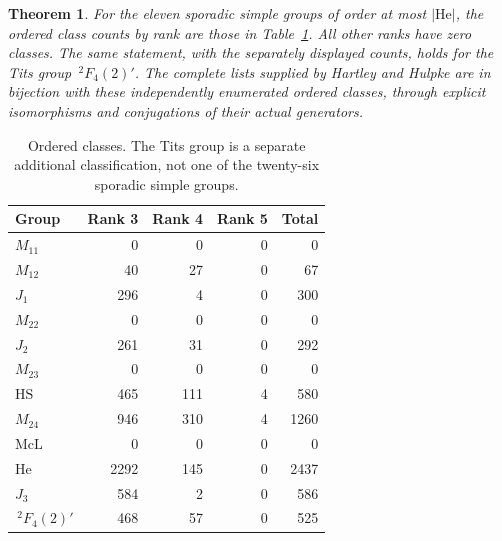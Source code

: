 \documentclass[11pt,a4paper]{article}
\newtheorem{theorem}{Theorem}
\begin{document}
\begin{theorem}\label{sporadic}
For the eleven sporadic simple groups of order at most $|\mathrm{He}|$,
the ordered class counts by rank are those in Table~\ref{sporadic-table}.
All other ranks have zero classes. The same statement, with the separately
displayed counts, holds for the Tits group $\,{}^2F_4(2)'$.
The complete lists supplied by Hartley and Hulpke are in bijection with
these independently enumerated ordered classes, through explicit
isomorphisms and conjugations of their actual generators.
\end{theorem}
\begin{table}[ht]
\centering
\begin{tabular}{lrrrr}
\toprule Group & Rank 3 & Rank 4 & Rank 5 & Total\\\midrule
$M_{11}$ & 0 & 0 & 0 & 0\\
$M_{12}$ & 40 & 27 & 0 & 67\\
$J_1$ & 296 & 4 & 0 & 300\\
$M_{22}$ & 0 & 0 & 0 & 0\\
$J_2$ & 261 & 31 & 0 & 292\\
$M_{23}$ & 0 & 0 & 0 & 0\\
$\mathrm{HS}$ & 465 & 111 & 4 & 580\\
$M_{24}$ & 946 & 310 & 4 & 1260\\
$\mathrm{McL}$ & 0 & 0 & 0 & 0\\
$\mathrm{He}$ & 2292 & 145 & 0 & 2437\\
$J_3$ & 584 & 2 & 0 & 586\\\midrule
$\,{}^2F_4(2)'$ & 468 & 57 & 0 & 525\\
\bottomrule
\end{tabular}
\caption{Ordered classes. The Tits group is a separate additional
classification, not one of the twenty-six sporadic simple groups.}
\label{sporadic-table}
\end{table}
\end{document}

